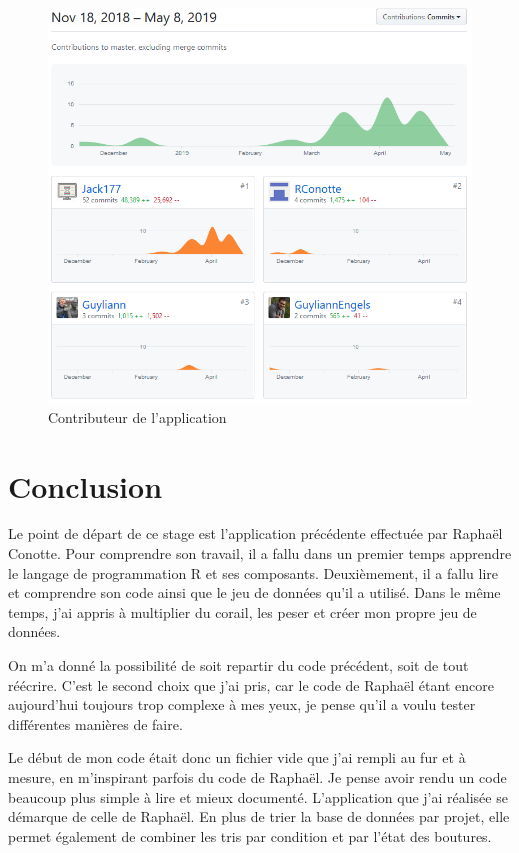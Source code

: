\documentclass[]{article}
\begin{document}
\begin{figure}
\centering
\includegraphics{../image/github.PNG}
\caption{Contributeur de l'application}
\end{figure}

\section{Conclusion}\label{conclusion}

Le point de départ de ce stage est l'application précédente effectuée
par Raphaël Conotte. Pour comprendre son travail, il a fallu dans un
premier temps apprendre le langage de programmation R et ses composants.
Deuxièmement, il a fallu lire et comprendre son code ainsi que le jeu de
données qu'il a utilisé. Dans le même temps, j'ai appris à multiplier du
corail, les peser et créer mon propre jeu de données.

On m'a donné la possibilité de soit repartir du code précédent, soit de
tout réécrire. C'est le second choix que j'ai pris, car le code de
Raphaël étant encore aujourd'hui toujours trop complexe à mes yeux, je
pense qu'il a voulu tester différentes manières de faire.

Le début de mon code était donc un fichier vide que j'ai rempli au fur
et à mesure, en m'inspirant parfois du code de Raphaël. Je pense avoir
rendu un code beaucoup plus simple à lire et mieux documenté.
L'application que j'ai réalisée se démarque de celle de Raphaël. En plus
de trier la base de données par projet, elle permet également de
combiner les tris par condition et par l'état des boutures.
\end{document}
